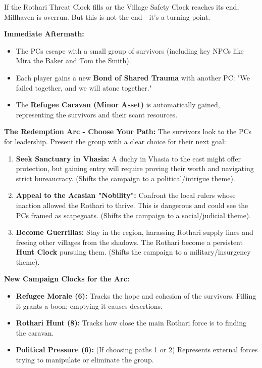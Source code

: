 \documentclass[11pt]{article}
\begin{document}
If the Rothari Threat Clock fills or the Village Safety Clock reaches its end, Millhaven is overrun. But this is not the end—it's a turning point.

\textbf{Immediate Aftermath:}
\begin{itemize}
\item The PCs escape with a small group of survivors (including key NPCs like Mira the Baker and Tom the Smith).
\item Each player gains a new \textbf{Bond of Shared Trauma} with another PC: "We failed together, and we will atone together."
\item The \textbf{Refugee Caravan (Minor Asset)} is automatically gained, representing the survivors and their scant resources.
\end{itemize}

\textbf{The Redemption Arc - Choose Your Path:}
The survivors look to the PCs for leadership. Present the group with a clear choice for their next goal:

\begin{enumerate}
\item \textbf{Seek Sanctuary in Vhasia:} A duchy in Vhasia to the east might offer protection, but gaining entry will require proving their worth and navigating strict bureaucracy. (Shifts the campaign to a political/intrigue theme).
\item \textbf{Appeal to the Acasian "Nobility":} Confront the local rulers whose inaction allowed the Rothari to thrive. This is dangerous and could see the PCs framed as scapegoats. (Shifts the campaign to a social/judicial theme).
\item \textbf{Become Guerrillas:} Stay in the region, harassing Rothari supply lines and freeing other villages from the shadows. The Rothari become a persistent \textbf{Hunt Clock} pursuing them. (Shifts the campaign to a military/insurgency theme).
\end{enumerate}

\textbf{New Campaign Clocks for the Arc:}
\begin{itemize}
\item \textbf{Refugee Morale (6):} Tracks the hope and cohesion of the survivors. Filling it grants a boon; emptying it causes desertions.
\item \textbf{Rothari Hunt (8):} Tracks how close the main Rothari force is to finding the caravan.
\item \textbf{Political Pressure (6):} (If choosing paths 1 or 2) Represents external forces trying to manipulate or eliminate the group.
\end{itemize}
\end{document}
